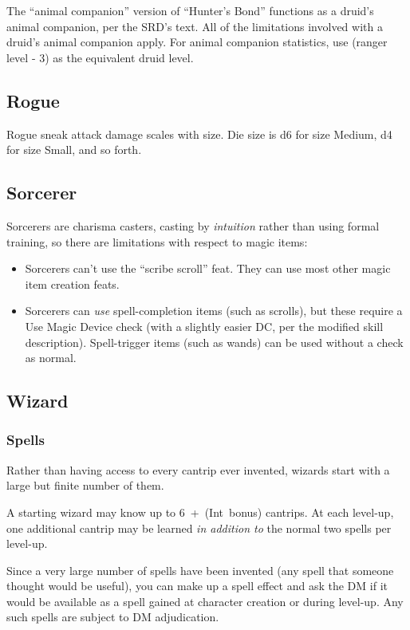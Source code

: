 The ``animal companion'' version of ``Hunter's Bond'' functions as a
druid's animal companion, per the SRD's text. All of the limitations
involved with a druid's animal companion apply. For animal companion
statistics, use (ranger level - 3) as the equivalent druid level.
%

%
\subsection{Rogue}

Rogue sneak attack damage scales with size. Die size is d6 for size Medium,
d4 for size Small, and so forth.
%

%
\subsection{Sorcerer}

Sorcerers are charisma casters, casting by \textit{intuition} rather than
using formal training, so there are limitations with respect to magic items:

\begin{itemize}
\item Sorcerers can't use the ``scribe scroll'' feat. They can use most
other magic item creation feats.
\item Sorcerers can \textit{use} spell-completion items (such as scrolls),
but these require a Use Magic Device check (with a slightly easier DC, per
the modified skill description). Spell-trigger items (such as wands) can be
used without a check as normal.
\end{itemize}
%

%
\subsection{Wizard}

\subsubsection{Spells}

Rather than having access to every cantrip ever invented, wizards start
with a large but finite number of them.

A starting wizard may know up to 6~+~(Int~bonus) cantrips. At each level-up,
one additional cantrip may be learned \textit{in addition to} the normal
two spells per level-up.

Since a very large number of spells have been invented (any spell that
someone thought would be useful), you can make up a spell effect and ask
the DM if it would be available as a spell gained at character creation or
during level-up. Any such spells are subject to DM adjudication.


